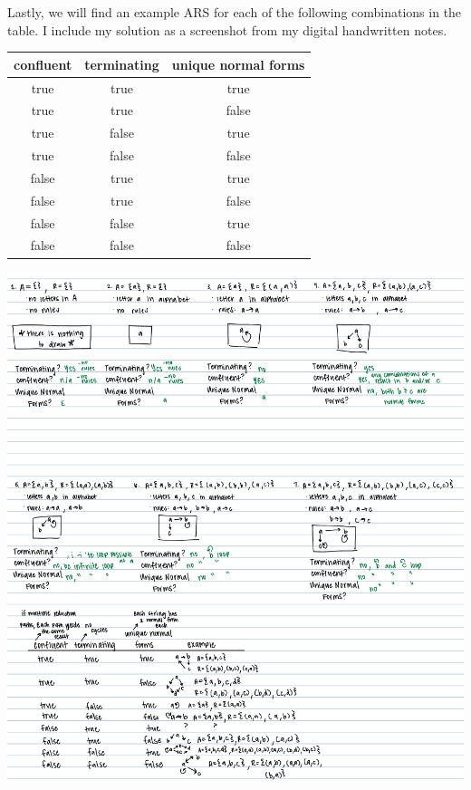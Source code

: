 \documentclass{article}
\theoremstyle{theorem}
\theoremstyle{definition}
\theoremstyle{remark}
\begin{document}
Lastly, we will find an example ARS for each of the following combinations in the table. I include my solution as a screenshot from my digital handwritten notes. 
\begin{center}
  \begin{tabular}{||c c c ||} 
   \hline
   confluent & terminating & unique normal forms \\ [0.5ex] 
   \hline\hline
   true & true & true \\ 
   \hline
   true & true & false \\
   \hline
   true & false & true \\
   \hline
   true & false & false \\
   \hline
   false & true & true \\
   \hline
   false & true & false \\
   \hline
   false & false & true \\
   \hline
   false & false & false \\ [1ex] 
   \hline
  \end{tabular}
\end{center}
\includegraphics[width=15cm]{arsTable.png}
\end{document}
